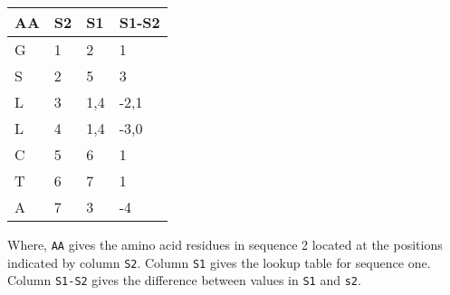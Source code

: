 \begin{minipage}[t]{0.5\textwidth}
  {\small
    \setlength{\tabcolsep}{0.5em}
    \begin{tabular}[t]{l|ll|l}
      AA & S2 & S1 & S1-S2 \\
      \hline
      G & 1 & 2 & 1\\
      S & 2 & 5 & 3\\
      L & 3 & 1,4 & -2,1 \\
      L & 4 & 1,4 & -3,0\\
      C & 5 & 6 & 1\\
      T & 6 & 7 & 1\\
      A & 7 & 3 & -4 \\
    \end{tabular}
  }
\end{minipage} 
\begin{minipage}[t]{0.5\textwidth}
  {\small
  Where, \texttt{AA} gives the amino acid residues in sequence 2 located at
  the positions indicated by column \texttt{S2}. Column \texttt{S1} gives
  the lookup table for sequence one. Column \texttt{S1-S2} gives the
  difference between values in \texttt{S1} and \texttt{s2}.
  }
\end{minipage}
  
